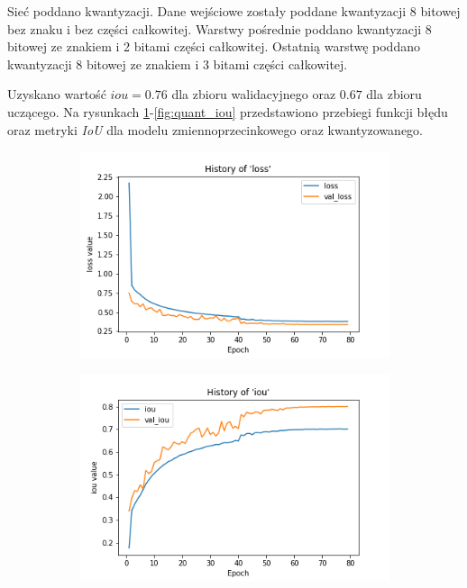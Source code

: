 Sieć poddano kwantyzacji. Dane wejściowe zostały poddane kwantyzacji 8 bitowej bez znaku i bez części całkowitej.
Warstwy pośrednie poddano kwantyzacji 8 bitowej ze znakiem i 2 bitami części całkowitej.
Ostatnią warstwę poddano kwantyzacji 8 bitowej ze znakiem i 3 bitami części całkowitej.

Uzyskano wartość $iou = 0.76$ dla zbioru walidacyjnego oraz $0.67$ dla zbioru uczącego.
Na rysunkach \ref{fig:float_loss}-\ref{fig:quant_iou} przedstawiono przebiegi funkcji błędu oraz metryki \emph{IoU} dla modelu zmiennoprzecinkowego oraz kwantyzowanego.

\begin{figure}
     \centering
     \begin{subfigure}[b]{0.49\textwidth}
         \centering
         \includegraphics[width=\textwidth]{images/float32_hist_of_loss.png}
         \caption{}
         \label{fig:float_loss}
     \end{subfigure}
     \hfill
     \begin{subfigure}[b]{0.49\textwidth}
         \centering
         \includegraphics[width=\textwidth]{images/float32_hist_of_iou.png}

\end{subfigure}
\end{figure}

